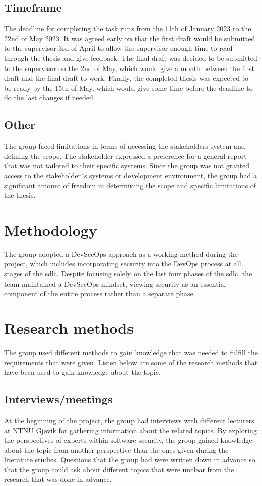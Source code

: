 \subsection{Timeframe}
The deadline for completing the task runs from the 11th of January 2023 to the 22nd of May 2023. It was agreed early on that the first draft would be submitted to the supervisor 3rd of April to allow the supervisor enough time to read through the thesis and give feedback. The final draft was decided to be submitted to the supervisor on the 2nd of May, which would give a month between the first draft and the final draft to work. Finally, the completed thesis was expected to be ready by the 15th of May, which would give some time before the deadline to do the last changes if needed. 



\subsection{Other}
The group faced limitations in terms of accessing the stakeholders system and defining the scope. The stakeholder expressed a preference for a general report that was not tailored to their specific systems. Since the group was not granted access to the stakeholder´s systems or development environment, the group had a significant amount of freedom in determining the scope and specific limitations of the thesis. 

\section{Methodology}
The group adopted a DevSecOps approach as a working method during the project, which includes incorporating security into the DevOps process at all stages of the \acrshort{sdlc}. Despite focusing solely on the last four phases of the \acrshort{sdlc}, the team maintained a DevSecOps mindset, viewing security as an essential component of the entire process rather than a separate phase. 

\newpage
\section{Research methods}
The group used different methods to gain knowledge that was needed to fulfill the requirements that were given. 
Listen below are some of the research methods that have been used to gain knowledge about the topic. 
\subsection{Interviews/meetings}
At the beginning of the project, the group had interviews with different lecturers at NTNU Gjøvik for gathering information about the related topics. By exploring the perspectives of experts within software security, the group gained knowledge about the topic from another perspective than the ones given during the literature studies. Questions that the group had were written down in advance so that the group could ask about different topics that were unclear from the research that was done in advance.   

